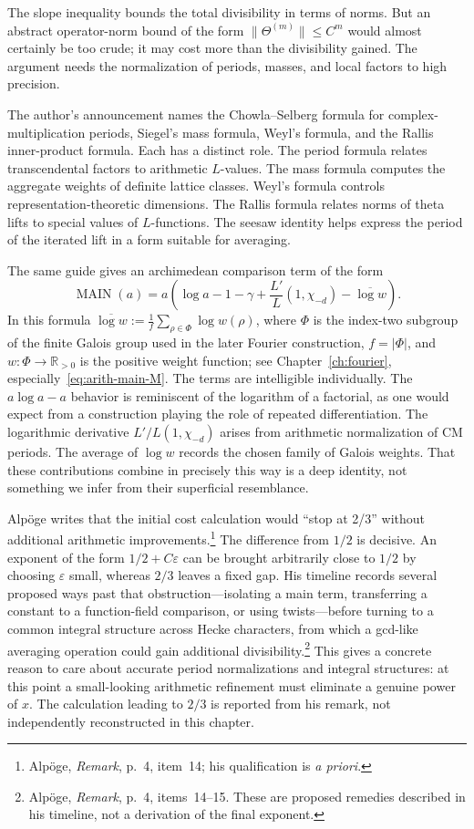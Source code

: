 \documentclass[11pt,openany,oneside]{scrbook}
\theoremstyle{definition}
\theoremstyle{remark}
\newcommand{\RR}{\mathbb R}
\newcommand{\eps}{\varepsilon}
\begin{document}
The slope inequality bounds the total divisibility in terms of norms. But an abstract operator-norm bound of the form $\|\Theta^{(m)}\|\le C^m$ would almost certainly be too crude; it may cost more than the divisibility gained. The argument needs the normalization of periods, masses, and local factors to high precision.

The author's announcement names the Chowla--Selberg formula for complex-multiplication periods, Siegel's mass formula, Weyl's formula, and the Rallis inner-product formula. Each has a distinct role. The period formula relates transcendental factors to arithmetic $L$-values. The mass formula computes the aggregate weights of definite lattice classes. Weyl's formula controls representation-theoretic dimensions. The Rallis formula relates norms of theta lifts to special values of $L$-functions. The seesaw identity helps express the period of the iterated lift in a form suitable for averaging.

The same guide gives an archimedean comparison term of the form
\begin{equation}\label{eq:main-cost}
\operatorname{MAIN}(a)
=a\left(\log a-1-\gamma+\frac{L'}{L}(1,\chi_{-d})
-\overline{\log w}\right).
\end{equation}
In this formula $\overline{\log w}:=\frac1f\sum_{\rho\in\Phi}\log w(\rho)$, where $\Phi$ is the index-two subgroup of the finite Galois group used in the later Fourier construction, $f=|\Phi|$, and $w:\Phi\to\RR_{>0}$ is the positive weight function; see Chapter~\ref{ch:fourier}, especially~\eqref{eq:arith-main-M}. The terms are intelligible individually. The $a\log a-a$ behavior is reminiscent of the logarithm of a factorial, as one would expect from a construction playing the role of repeated differentiation. The logarithmic derivative $L'/L(1,\chi_{-d})$ arises from arithmetic normalization of CM periods. The average of $\log w$ records the chosen family of Galois weights. That these contributions combine in precisely this way is a deep identity, not something we infer from their superficial resemblance.

Alp\"oge writes that the initial cost calculation would ``stop at 2/3'' without additional arithmetic improvements.\footnote{Alp\"oge, \emph{Remark}, p.~4, item~14; his qualification is \emph{a priori}.} The difference from $1/2$ is decisive. An exponent of the form $1/2+C\eps$ can be brought arbitrarily close to $1/2$ by choosing $\eps$ small, whereas $2/3$ leaves a fixed gap. His timeline records several proposed ways past that obstruction---isolating a main term, transferring a constant to a function-field comparison, or using twists---before turning to a common integral structure across Hecke characters, from which a gcd-like averaging operation could gain additional divisibility.\footnote{Alp\"oge, \emph{Remark}, p.~4, items~14--15. These are proposed remedies described in his timeline, not a derivation of the final exponent.} This gives a concrete reason to care about accurate period normalizations and integral structures: at this point a small-looking arithmetic refinement must eliminate a genuine power of $x$. The calculation leading to $2/3$ is reported from his remark, not independently reconstructed in this chapter.
\end{document}
